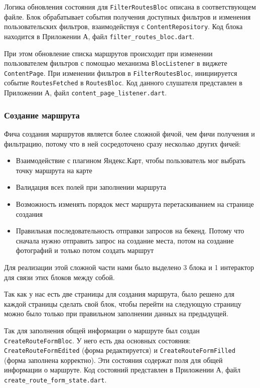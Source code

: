 Логика обновления состояния для \texttt{FilterRoutesBloc} описана в соответствующем файле. Блок обрабатывает события получения доступных фильтров и изменения пользовательских фильтров, взаимодействуя с \texttt{ContentRepository}. Код блока находится в Приложении А, файл \texttt{filter\_routes\_bloc.dart}.

При этом обновление списка маршрутов происходит при изменении пользователем фильтров с помощью механизма \texttt{BlocListener} в виджете \texttt{ContentPage}. При изменении фильтров в \texttt{FilterRoutesBloc}, инициируется событие \texttt{RoutesFetched} в \texttt{RoutesBloc}. Код данного слушателя представлен в Приложении А, файл \texttt{content\_page\_listener.dart}.

\subsubsection*{Создание маршрута}
Фича создания маршрутов является более сложной фичой, чем фичи получения и фильтрацию, потому что в ней сосредоточено сразу несколько других фичей:

\begin{itemize}
    \item Взаимодействие с плагином Яндекс.Карт, чтобы пользователь мог выбрать точку маршрута на карте
    \item Валидация всех полей при заполнении маршрута
    \item Возможность изменять порядок мест маршрута перетаскиванием на странице создания
    \item Правильная последовательность отправки запросов на бекенд. Потому что сначала нужно отправить запрос на создание места, потом на создание фотографий и только потом создать маршрут
\end{itemize}

Для реализации этой сложной части нами было выделено 3 блока и 1 интерактор для связи этих блоков между собой.

Так как у нас есть две страницы для создания маршрута, было решено для каждой страницы сделать свой блок, чтобы перейти на следующую страницу можно было только при правильном заполнении данных на предыдущей. 

Так для  заполнения общей информации о маршруте был создан \texttt{CreateRouteFormBloc}. У него есть два основных состояния: \texttt{CreateRouteFormEdited} (форма редактируется) и \texttt{CreateRouteFormFilled} (форма заполнена корректно). Эти состояния содержат поля для общей информации о маршруте. Код состояний представлен в Приложении А, файл \texttt{create\_route\_form\_state.dart}.

